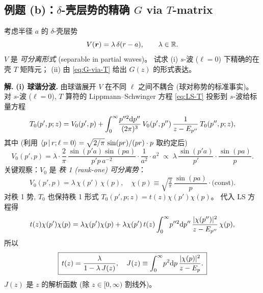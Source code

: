 \subsection{例题 (b)：$\delta$-壳层势的精确 $G$ via $T$-matrix}

\begin{example}\label{ex:G-delta-shell}
考虑半径 $a$ 的 $\delta$-壳层势
\begin{equation}\label{eq:G-deltashell-V}
  V(\bm r) = \lambda\,\delta(r-a),\qquad \lambda\in\mathbb{R}.
\end{equation}
$V$ 是 \emph{可分离形式} (separable in partial waves)。
试求 (i) $s$-波 ($\ell=0$) 下精确的在壳 $T$ 矩阵元；
(ii) 由 \eqref{eq:G-via-T} 给出 $G(z)$ 的形式表达。
\end{example}

\textbf{解.}
\textbf{(i) 球谐分波.}
由球谐展开 $V$ 在不同 $\ell$ 之间不耦合 (球对称势的标准事实)。
对 $s$-波 ($\ell=0$), $T$ 算符的 Lippmann--Schwinger 方程
\eqref{eq:LS-T} 投影到 $s$-波给标量方程
\begin{equation}
  T_0(p',p;z) = V_0(p',p) + \int_0^\infty\!\frac{p''^2\mathrm{d} p''}{(2\pi)^3}\,
                V_0(p',p'')\,\frac{1}{z-E_{p''}}\,T_0(p'',p;z),
\end{equation}
其中 (利用 $\left\langle p \,\middle|\, r;\ell=0 \right\rangle=\sqrt{2/\pi}\,\sin(pr)/(pr)\cdot p$ 取约定后)
\begin{equation}\label{eq:G-deltashell-V0}
  V_0(p',p) = \lambda\cdot \frac{2}{\pi}\,\frac{\sin(p'a)\sin(pa)}{p'p\,a^{-2}}\cdot\frac{1}{a^2}\cdot a^2
  \;\propto\; \lambda\,\frac{\sin(p'a)}{p'}\cdot\frac{\sin(pa)}{p}.
\end{equation}
关键观察：$V_0$ 是 \emph{秩 1 (rank-one) 可分离势}：
\begin{equation}\label{eq:G-deltashell-separable}
  V_0(p',p) = \lambda\,\chi(p')\,\chi(p),\quad
  \chi(p)\equiv \sqrt{\tfrac{2}{\pi}}\,\frac{\sin(pa)}{p}\cdot\text{(const)}.
\end{equation}
对秩 1 势, $T_0$ 也保持秩 1 形式 $T_0(p',p;z)=t(z)\chi(p')\chi(p)$。
代入 LS 方程得
\begin{equation}
  t(z)\chi(p')\chi(p)
  = \lambda\chi(p')\chi(p) + \lambda\chi(p')\,t(z)
    \int_0^\infty\!p''^2\mathrm{d} p''\,\frac{|\chi(p'')|^2}{z-E_{p''}}\,\chi(p),
\end{equation}
所以
\begin{equation}\label{eq:G-deltashell-tofz}
  \boxed{\,
    t(z) = \frac{\lambda}{1-\lambda\,J(z)},
    \quad
    J(z) \equiv \int_0^\infty\!p^2\mathrm{d} p\,\frac{|\chi(p)|^2}{z-E_p}.\,}
\end{equation}
$J(z)$ 是 $z$ 的解析函数 (除 $z\in[0,\infty)$ 割线外)。

